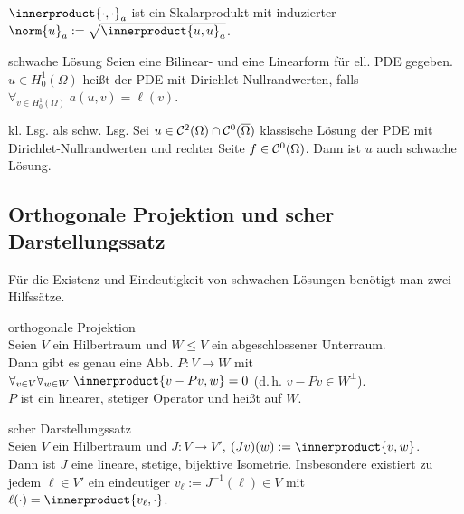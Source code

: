 \begin{Bem}
    $\innerproduct{\cdot, \cdot}_a$ ist ein Skalarprodukt mit induzierter
     $\norm{u}_a := \sqrt{\innerproduct{u, u}_a}$.
\end{Bem}

\linie

\begin{Def}{schwache Lösung}
    Seien eine Bilinear- und eine Linearform für ell. PDE gegeben.
    $u \in H^1_0(\Omega)$ heißt 
    der PDE mit Dirichlet-Nullrandwerten, falls $\forall_{v \in H^1_0(\Omega)}\; a(u,v) = \ell(v)$.
\end{Def}

\begin{Satz}{kl. Lsg. als schw. Lsg.}
    Sei $u \in \mathcal{C}^2(\Omega) \cap \mathcal{C}^0(\overline{\Omega})$ klassische Lösung der PDE mit
    Dirichlet-Nullrandwerten und rechter Seite $f \in \mathcal{C}^0(\Omega)$.
    Dann ist $u$ auch schwache Lösung.
\end{Satz}

\subsection{%
    Orthogonale Projektion und scher Darstellungssatz%
}

\begin{Bem}
    Für die Existenz und Eindeutigkeit von schwachen Lösungen benötigt man zwei Hilfssätze.
\end{Bem}

\begin{Satz}{orthogonale Projektion}\\
    Seien $V$ ein Hilbertraum und $W \le V$ ein abgeschlossener Unterraum.\\
    Dann gibt es genau eine Abb. $P\colon V \to W$ mit
    $\forall_{v \in V} \forall_{w \in W}\; \innerproduct{v - Pv, w} = 0$
    (d.\,h. $v - Pv \in W^\bot$).\\
    $P$ ist ein linearer, stetiger Operator und heißt  auf $W$.
\end{Satz}

\begin{Satz}{scher Darstellungssatz}\\
    Seien $V$ ein Hilbertraum und $J\colon V \to V'$, $(Jv)(w) := \innerproduct{v, w}$.\\
    Dann ist $J$ eine lineare, stetige, bijektive Isometrie.
    Insbesondere existiert zu jedem $\ell \in V'$ ein eindeutiger
     $v_\ell := J^{-1}(\ell) \in V$ mit
    $\ell(\cdot) = \innerproduct{v_\ell, \cdot}$.
\end{Satz}

